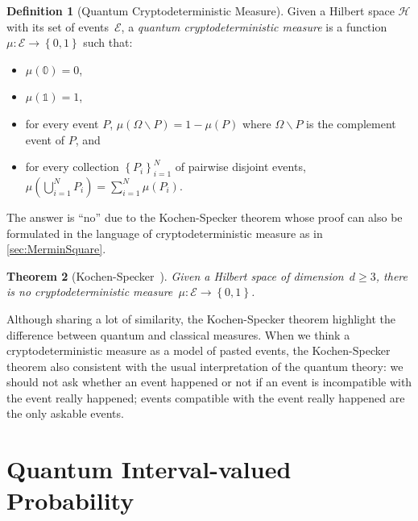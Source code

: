 \documentclass[12pt]{iopart}
\theoremstyle{plain}
\newtheorem{thm}{Theorem}
\theoremstyle{definition}
\newtheorem{definition}[thm]{Definition}
\newcommand{\Hilb}{\mathcal{H}}
\newcommand{\events}{\ensuremath{\mathcal{E}}}
\newcommand{\pmeas}{\ensuremath{\mu}}
\begin{document}
\begin{definition}[Quantum Cryptodeterministic Measure]\label{def:QuantumCryptodeterministicMeasures}Given
a Hilbert space $\Hilb$ with its set of events~$\events$, a \emph{quantum
cryptodeterministic measure} is a function~$\pmeas:\events\rightarrow\left\{ 0,1\right\} $
such that: 
\begin{itemize}
\item $\pmeas(\mathbb{0})=0$, 
\item $\pmeas(\mathbb{1})=1$, 
\item for every event $P$, $\pmeas\left(\Omega\backslash P\right)=1-\pmeas\left(P\right)$
where $\Omega\backslash P$ is the complement event of $P$, and 
\item for every collection $\left\{ P_{i}\right\} _{i=1}^{N}$ of pairwise
disjoint events, $\pmeas\left(\bigcup_{i=1}^{N}P_{i}\right)=\sum_{i=1}^{N}\pmeas(P_{i})$. 
\end{itemize}
\end{definition}

The answer is ``no'' due to the Kochen-Specker theorem whose proof
can also be formulated in the language of cryptodeterministic measure
as in \ref{sec:MerminSquare}.

\begin{thm}[Kochen-Specker~\cite{kochenspecker1967,peres1995quantum,Redhead1987-REDINA}]\label{thm:Kochen-Specker}Given
a Hilbert space of dimension~$d\ge3$, there is no cryptodeterministic
measure~$\pmeas:\events\rightarrow\left\{ 0,1\right\} $.\end{thm}

\noindent Although sharing a lot of similarity, the Kochen-Specker
theorem highlight the difference between quantum and classical measures.
When we think a cryptodeterministic measure as a model of pasted events,
the Kochen-Specker theorem also consistent with the usual interpretation
of the quantum theory: we should not ask whether an event happened
or not if an event is incompatible with the event really happened;
events compatible with the event really happened are the only askable
events.



\section{Quantum Interval-valued Probability}

\end{document}
